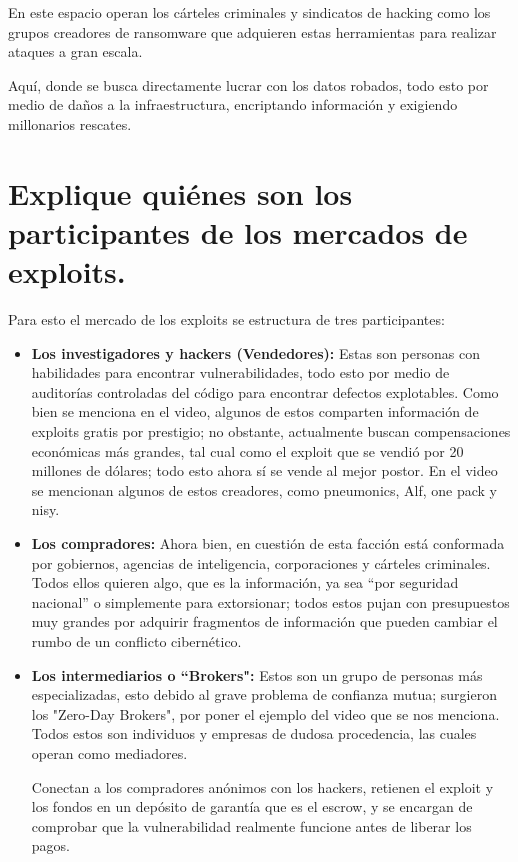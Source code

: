 \documentclass[letterpaper,11pt]{article}
\begin{document}
En este espacio operan los cárteles criminales y 
sindicatos de hacking como los grupos creadores de 
ransomware que adquieren estas herramientas 
para realizar ataques a gran escala. 

Aquí, donde se busca directamente 
lucrar con los datos robados, 
todo esto por medio de daños a la infraestructura, 
encriptando información y 
exigiendo millonarios rescates.

\section{Explique quiénes son los participantes de los mercados de exploits. }


Para esto el mercado 
de los exploits 
se estructura de tres participantes:

\begin{itemize}
    \item \textbf{Los investigadores y hackers (Vendedores):} 
    Estas son personas con habilidades para encontrar vulnerabilidades, 
    todo esto por medio de auditorías controladas del 
    código para encontrar defectos explotables. 
    Como bien se menciona en el video, 
    algunos de estos comparten información de exploits 
    gratis por prestigio; no obstante, 
    actualmente buscan 
    compensaciones económicas más grandes, tal cual como el exploit que se vendió por 20 millones de dólares; 
    todo esto ahora sí se vende al mejor postor.
    En el video se mencionan algunos de estos creadores, como pneumonics, Alf, one pack y nisy.
    \item \textbf{Los compradores:} Ahora bien, en cuestión de esta 
    facción está conformada por gobiernos, 
    agencias de inteligencia, 
    corporaciones y cárteles criminales. 
    Todos ellos quieren algo, que es la información, ya sea ``por seguridad nacional'' o simplemente para extorsionar; 
    todos estos pujan con presupuestos muy grandes 
    por adquirir fragmentos 
    de información que pueden cambiar el rumbo de un conflicto cibernético.

    \item \textbf{Los intermediarios o ``Brokers":} 
    Estos son un grupo de personas más especializadas, 
    esto debido al grave problema de confianza mutua; 
    surgieron los "Zero-Day Brokers", por poner el ejemplo del video que se nos menciona. 
    Todos estos son individuos y empresas 
    de dudosa procedencia, las cuales operan como mediadores. 
    
    Conectan a los compradores anónimos con los hackers, 
    retienen el exploit y los fondos en un depósito de garantía que es el escrow, 
    y se encargan de comprobar que la vulnerabilidad realmente funcione antes de liberar los pagos.


\end{itemize}
\end{document}
